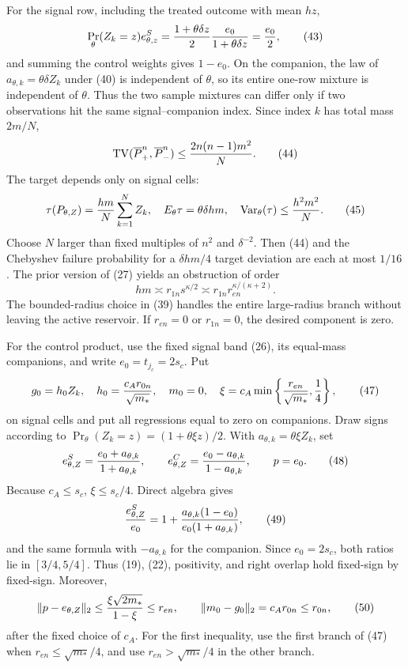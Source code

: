 For the signal row, including the treated outcome with mean \(hz\),
\[
\Pr_\theta(Z_k=z)e^S_{\theta,z}
={1+\theta\delta z\over2}{e_0\over1+\theta\delta z}={e_0\over2},        \tag{43}
\]
and summing the control weights gives \(1-e_0\).  On the companion, the law of \(a_{\theta,k}=\theta\delta Z_k\) under (40) is independent of \(\theta\), so its entire one-row mixture is independent of \(\theta\).  Thus the two sample mixtures can differ only if two observations hit the same signal--companion index.  Since index \(k\) has total mass \(2m/N\),
\[
\operatorname{TV}(\overline P_+^n,\overline P_-^n)
\leq {2n(n-1)m^2\over N}.                                                \tag{44}
\]
The target depends only on signal cells:
\[
\tau(P_{\theta,Z})={hm\over N}\sum_{k=1}^NZ_k,\quad
E_\theta\tau=\theta\delta hm,\quad
\operatorname{Var}_\theta(\tau)\leq {h^2m^2\over N}.                   \tag{45}
\]
Choose \(N\) larger than fixed multiples of \(n^2\) and \(\delta^{-2}\).  Then (44) and the Chebyshev failure probability for a \(\delta hm/4\) target deviation are each at most \(1/16\).  The prior version of (27) yields an obstruction of order
\[
hm\asymp r_{1n}s^{\kappa/2}\asymp
r_{1n}r_{en}^{\kappa/(\kappa+2)}.                                        \tag{46}
\]
The bounded-radius choice in (39) handles the entire large-radius branch without leaving the active reservoir.  If \(r_{en}=0\) or \(r_{1n}=0\), the desired component is zero.

For the control product, use the fixed signal band (26), its equal-mass companions, and write \(e_0=t_{j_c}=2s_c\).  Put
\[
g_0=h_0Z_k,\quad h_0={c_A r_{0n}\over\sqrt{m_*}},\quad m_0=0,\quad
\xi=c_A\min\left\{{r_{en}\over\sqrt{m_*}},{1\over4}\right\},         \tag{47}
\]
on signal cells and put all regressions equal to zero on companions.  Draw signs according to \(\Pr_\theta(Z_k=z)=(1+\theta\xi z)/2\).  With \(a_{\theta,k}=\theta\xi Z_k\), set
\[
e^S_{\theta,Z}={e_0+a_{\theta,k}\over1+a_{\theta,k}},\qquad
e^C_{\theta,Z}={e_0-a_{\theta,k}\over1-a_{\theta,k}},\qquad p=e_0.     \tag{48}
\]
Because \(c_A\leq s_c\), \(\xi\leq s_c/4\).  Direct algebra gives
\[
{e^S_{\theta,Z}\over e_0}
=1+{a_{\theta,k}(1-e_0)\over e_0(1+a_{\theta,k})},                      \tag{49}
\]
and the same formula with \(-a_{\theta,k}\) for the companion.  Since \(e_0=2s_c\), both ratios lie in \([3/4,5/4]\).  Thus (19), (22), positivity, and right overlap hold fixed-sign by fixed-sign.  Moreover,
\[
\|p-e_{\theta,Z}\|_2
\leq{\xi\sqrt{2m_*}\over1-\xi}\leq r_{en},\qquad
\|m_0-g_0\|_2=c_A r_{0n}\leq r_{0n},                                    \tag{50}
\]
after the fixed choice of \(c_A\).  For the first inequality, use the first branch of (47) when \(r_{en}\leq\sqrt{m_*}/4\), and use \(r_{en}>\sqrt{m_*}/4\) in the other branch.

